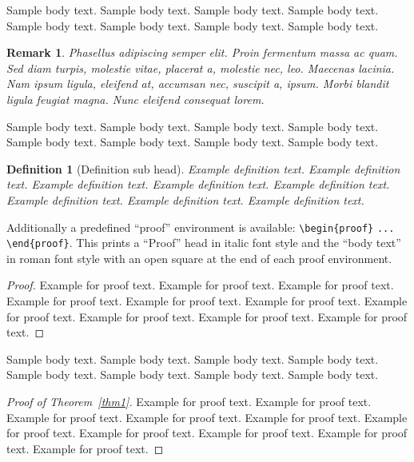 \documentclass[pdflatex,sn-mathphys]{sn-jnl}%
\theoremstyle{thmstyleone}%
\theoremstyle{thmstyletwo}%
\newtheorem{remark}{Remark}%
\theoremstyle{thmstylethree}%
\newtheorem{definition}{Definition}%
\begin{document}
Sample body text.
Sample body text.
Sample body text.
Sample body text.
Sample body text.
Sample body text.
Sample body text.
Sample body text.

\begin{remark}
  Phasellus adipiscing semper elit.
  Proin fermentum massa ac quam.
  Sed diam turpis, molestie vitae, placerat a, molestie nec, leo.
  Maecenas lacinia.
  Nam ipsum ligula, eleifend at, accumsan nec, suscipit a, ipsum.
  Morbi blandit ligula feugiat magna.
  Nunc eleifend consequat lorem.
\end{remark}

Sample body text.
Sample body text.
Sample body text.
Sample body text.
Sample body text.
Sample body text.
Sample body text.
Sample body text.

\begin{definition}[Definition sub head]
  Example definition text.
  Example definition text.
  Example definition text.
  Example definition text.
  Example definition text.
  Example definition text.
  Example definition text.
  Example definition text.
\end{definition}

Additionally a predefined ``proof'' environment is available: \verb+\begin{proof}+ \verb+...+ \verb+\end{proof}+.
This prints a ``Proof'' head in italic font style and the ``body text'' in roman font style with an open square at the end of each proof environment.

\begin{proof}
  Example for proof text.
  Example for proof text.
  Example for proof text.
  Example for proof text.
  Example for proof text.
  Example for proof text.
  Example for proof text.
  Example for proof text.
  Example for proof text.
  Example for proof text.
\end{proof}

Sample body text.
Sample body text.
Sample body text.
Sample body text.
Sample body text.
Sample body text.
Sample body text.
Sample body text.

\begin{proof}[Proof of Theorem~{\upshape\ref{thm1}}]
  Example for proof text.
  Example for proof text.
  Example for proof text.
  Example for proof text.
  Example for proof text.
  Example for proof text.
  Example for proof text.
  Example for proof text.
  Example for proof text.
  Example for proof text.
\end{proof}
\end{document}
